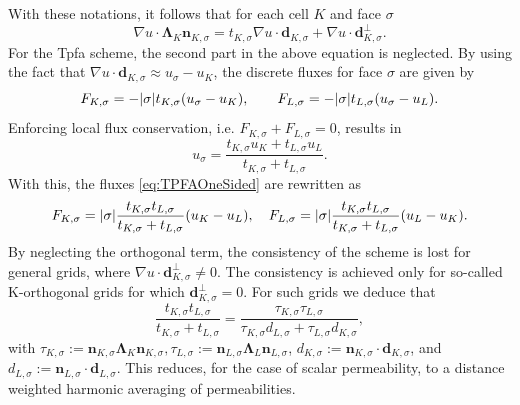 With these notations, it follows that for each cell $K$ and face $\sigma$
\begin{equation}
\nabla u \cdot \mathbf{\Lambda}_K \mathbf{n}_{K, \sigma} =  t_{K,\sigma} \nabla u \cdot \mathbf{d}_{K,\sigma} + \nabla u \cdot \mathbf{d}^{\bot}_{K,\sigma}.
\end{equation}
For the Tpfa scheme, the second part in the above equation is neglected. By using the fact that $\nabla u \cdot \mathbf{d}_{K,\sigma} \approx u_\sigma - u_K$, the discrete fluxes for face $\sigma$ are given by
\begin{equation}
F_{K,\sigma} = -\lvert{\sigma}\rvert  t_{K,\sigma} (u_\sigma - u_K), \qquad F_{L,\sigma} = -\lvert{\sigma}\rvert  t_{L,\sigma} (u_\sigma - u_L).
\label{eq:TPFAOneSided}
\end{equation}
Enforcing local flux conservation, i.e. $F_{K,\sigma}+F_{L,\sigma}=0$, results in
\begin{equation}
u_\sigma = \frac{t_{K,\sigma} u_K + t_{L,\sigma} u_L}{t_{K,\sigma}  + t_{L,\sigma}}.
\end{equation}
With this, the fluxes \eqref{eq:TPFAOneSided} are rewritten as
\begin{equation}
F_{K,\sigma} = \lvert{\sigma}\rvert  \frac{t_{K,\sigma} t_{L,\sigma}}{t_{K,\sigma} + t_{L,\sigma}} (u_K - u_L), \quad F_{L,\sigma} = \lvert{\sigma}\rvert  \frac{t_{K,\sigma} t_{L,\sigma}}{t_{K,\sigma} + t_{L,\sigma}} (u_L - u_K).
\label{eq:TPFAFlux}
\end{equation}
By neglecting the orthogonal term, the consistency of the scheme is lost for general grids, where $\nabla u \cdot \mathbf{d}^{\bot}_{K,\sigma} \not = 0$. The consistency is achieved only for so-called K-orthogonal grids for which $\mathbf{d}^{\bot}_{K,\sigma} = 0$. For such grids we deduce that
\begin{equation}
\frac{t_{K,\sigma} t_{L,\sigma}}{t_{K,\sigma} + t_{L,\sigma}} = \frac{\tau_{K,\sigma} \tau_{L,\sigma}}{\tau_{K,\sigma} d_{L,\sigma} + \tau_{L,\sigma} d_{K,\sigma}},
\label{eq:TPFAcoeffNew}
\end{equation}
with $\tau_{K,\sigma} := \mathbf{n}_{K, \sigma} \mathbf{\Lambda}_K\mathbf{n}_{K, \sigma}, \tau_{L,\sigma} := \mathbf{n}_{L, \sigma} \mathbf{\Lambda}_L\mathbf{n}_{L, \sigma}$, $d_{K,\sigma}:= \mathbf{n}_{K, \sigma} \cdot \mathbf{d}_{K, \sigma}$, and $d_{L,\sigma}:= \mathbf{n}_{L, \sigma} \cdot \mathbf{d}_{L, \sigma}$. This reduces, for the case of scalar permeability, to a distance weighted harmonic averaging of permeabilities.



